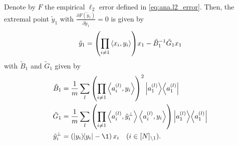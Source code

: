 \begin{lemma}%
  \label{lem:ana.gradient_of_error}
  Denote by $F$ the empirical $\ell_2$ error defined in \cref{eq:ana.l2_error}.
  Then, the extremal point $\tilde y_1$ with $\frac{\partial F(\tilde y_1)}{\partial \tilde y_1} = 0$ is given by
  \[
    {\tilde y_1} = {\left( \prod_{i \neq 1} \Braket{x_i, y_i} \right)} {x_1} - \tilde B_1^{-1} \tilde G_1 {x_1}
    \label{eq:ana.gradient_of_error}
  \]
  with $\tilde B_1$ and $\tilde G_1$ given by
  \begin{align}
    \label{eq:ana.b_operator}
    \tilde B_1 &= \frac{1}{m} \sum_l {\left( \prod_{i \neq 1} \Braket{a\ind{l}_i,y_i} \right)}^2 \Ketbra{a\ind{l}_1} \\
    \label{eq:ana.g_operator}
    \tilde G_1 &= \frac{1}{m} \sum_l {\left( \prod_{i \neq 1} \Braket{a\ind{l}_i, \tilde y_i^\perp} \Braket{a\ind{l}_i,y_i} \right)}\Ketbra{a\ind{l}_1} \\
    \tilde y_i^\perp &= \left(\ketbra{y_i} - \1 \right) x_i \quad(i \in \NsetSub{1}).
  \end{align}
\end{lemma}
